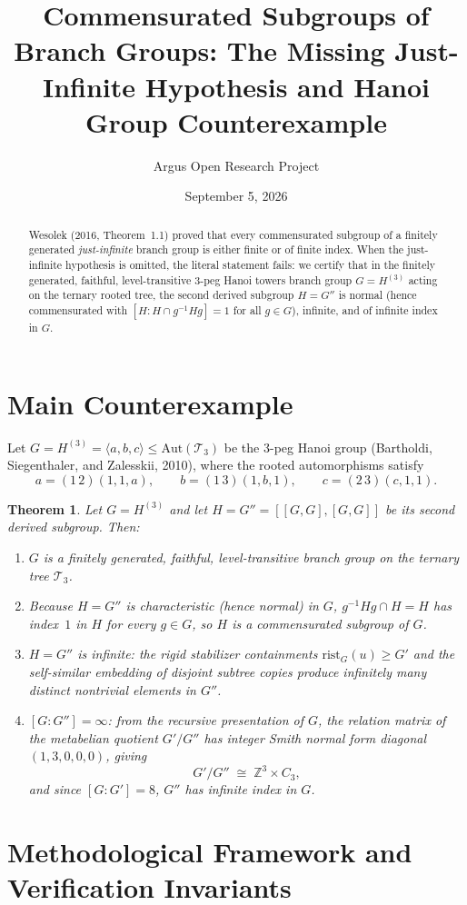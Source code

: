\documentclass[10pt,reqno]{amsart}
\title[Commensurated Subgroups of Branch Groups and the Hanoi Group]
{Commensurated Subgroups of Branch Groups: The Missing Just-Infinite Hypothesis and Hanoi Group Counterexample}
\author{Argus Open Research Project}
\date{September 5, 2026}
\newtheorem{theorem}{Theorem}[section]
\theoremstyle{definition}
\begin{document}
\begin{abstract}
Wesolek (2016, Theorem~1.1) proved that every commensurated subgroup of a finitely generated \emph{just-infinite} branch group is either finite or of finite index. When the just-infinite hypothesis is omitted, the literal statement fails: we certify that in the finitely generated, faithful, level-transitive 3-peg Hanoi towers branch group $G=H^{(3)}$ acting on the ternary rooted tree, the second derived subgroup $H=G''$ is normal (hence commensurated with $[H : H\cap g^{-1}Hg]=1$ for all $g\in G$), infinite, and of infinite index in $G$.
\end{abstract}
\maketitle
\section{Main Counterexample}
Let $G=H^{(3)}=\langle a,b,c\rangle\le\mathrm{Aut}(\mathcal{T}_3)$ be the 3-peg Hanoi group (Bartholdi, Siegenthaler, and Zalesskii, 2010), where the rooted automorphisms satisfy
\[
  a=(1\,2)(1,1,a),\qquad b=(1\,3)(1,b,1),\qquad c=(2\,3)(c,1,1).
\]
\begin{theorem}
Let $G=H^{(3)}$ and let $H=G''=[[G,G],[G,G]]$ be its second derived subgroup. Then:
\begin{enumerate}[label=\textup{(\arabic*)}]
  \item $G$ is a finitely generated, faithful, level-transitive branch group on the ternary tree $\mathcal{T}_3$.
  \item Because $H=G''$ is characteristic (hence normal) in $G$, $g^{-1}Hg\cap H = H$ has index~$1$ in $H$ for every $g\in G$, so $H$ is a commensurated subgroup of $G$.
  \item $H=G''$ is infinite: the rigid stabilizer containments $\mathrm{rist}_G(u)\ge G'$ and the self-similar embedding of disjoint subtree copies produce infinitely many distinct nontrivial elements in $G''$.
  \item $[G:G'']=\infty$: from the recursive presentation of $G$, the relation matrix of the metabelian quotient $G'/G''$ has integer Smith normal form diagonal $(1,3,0,0,0)$, giving
  \[
    G'/G'' \;\cong\; \mathbb{Z}^3 \times C_3,
  \]
  and since $[G:G']=8$, $G''$ has infinite index in $G$.
\end{enumerate}
\end{theorem}

\section{Methodological Framework and Verification Invariants}
\end{document}
